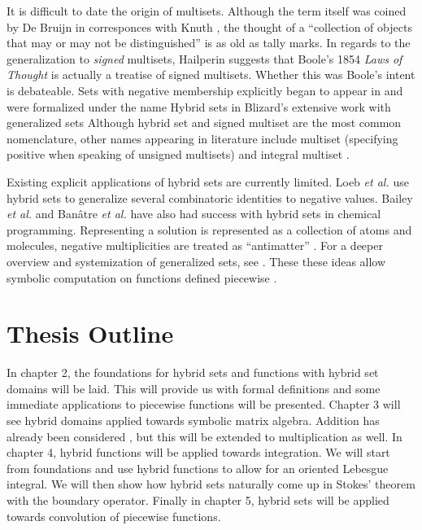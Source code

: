 It is difficult to date the origin of multisets.
Although the term itself was coined by De Bruijn in corresponces with Knuth \cite{knuth2014art},
the thought of a ``collection of objects that may or may not be distinguished'' is as old as tally marks. 
In regards to the generalization to \emph{signed} multisets, Hailperin \cite{hailperin1986boole} 
suggests that Boole's 1854 \emph{Laws of Thought} \cite{boole1854investigation} is actually a treatise of signed multisets.
Whether this was Boole's intent is debateable.
Sets with negative membership explicitly began to appear in \cite{whitney1933characteristic} and were 
formalized under the name Hybrid sets in Blizard's extensive work with generalized sets \cite{blizard1988, blizard1990} 
Although hybrid set and signed multiset are the most common nomenclature, other names appearing in literature include
multiset (specifying positive when speaking of unsigned multisets) \cite{reisig1985petri} 
and integral multiset \cite{wildberger2003new}. 


Existing explicit applications of hybrid sets are currently limited.
Loeb \emph{et al.} \cite{damiani1991, loeb1992} use hybrid sets to generalize several combinatoric identities to negative values.
Bailey \emph{et al.} \cite{bailey2009hypergraphic} and Ban\^{a}tre \emph{et al.} \cite{banatre2006} 
have also had success with hybrid sets in chemical programming. 
Representing a solution is represented as a collection of atoms and molecules, 
negative multiplicities are treated as ``antimatter'' . 
For a deeper overview and systemization of generalized sets, see \cite{singh2007, singh2008systematization}.
These these ideas allow symbolic computation on functions defined piecewise \cite{carette2010}.


\section{Thesis Outline}


In chapter 2, the foundations for hybrid sets and functions with hybrid set domains will be laid. 
This will provide us with formal definitions and some immediate applications to piecewise functions will be presented.
Chapter 3 will see hybrid domains applied towards symbolic matrix algebra.
Addition has already been considered \cite{carette2010}, but this will be extended to multiplication as well.
In chapter 4, hybrid functions will be applied towards integration. 
We will start from foundations and use hybrid functions to allow for an oriented Lebesgue integral.
We will then show how hybrid sets naturally come up in Stokes' theorem with the boundary operator.
Finally in chapter 5, hybrid sets will be applied towards convolution of piecewise functions.


















